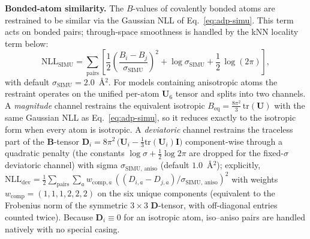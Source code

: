 \documentclass{iucrjournals}
\begin{document}
\textbf{Bonded-atom similarity.} The $B$-values of covalently bonded atoms are
restrained to be similar via the Gaussian NLL of Eq.~\ref{eq:adp-simu}. This
term acts on bonded pairs; through-space smoothness is handled by the kNN
locality term below:
%
\begin{equation}
  \mathrm{NLL}_\mathrm{SIMU} = \sum_\mathrm{pairs}
  \left[\frac{1}{2}\left(\frac{B_{i} - B_{j}}{\sigma_\mathrm{SIMU}}\right)^{2}
  + \log\sigma_\mathrm{SIMU} + \frac{1}{2}\,\log(2\pi)\right],
  \label{eq:adp-simu}
\end{equation}
%
with default $\sigma_\mathrm{SIMU} = 2.0$~\AA$^{2}$.
For models containing anisotropic atoms the restraint operates on the unified
per-atom $\mathbf{U}_{6}$ tensor and splits into two channels. A
\emph{magnitude} channel restrains the equivalent isotropic
$B_\mathrm{eq} = \tfrac{8\pi^{2}}{3}\,\mathrm{tr}(\mathbf{U})$ with the same
Gaussian NLL as Eq.~\ref{eq:adp-simu}, so it reduces exactly to the isotropic
form when every atom is isotropic. A \emph{deviatoric} channel restrains the
traceless part of the $\mathbf{B}$-tensor
$\mathbf{D}_{i} = 8\pi^{2}\,\bigl(\mathbf{U}_{i} - \tfrac{1}{3}\mathrm{tr}(\mathbf{U}_{i})\mathbf{I}\bigr)$
component-wise through a quadratic penalty (the constants
$\log\sigma + \tfrac{1}{2}\log 2\pi$ are dropped for the fixed-$\sigma$
deviatoric channel) with sigma $\sigma_\mathrm{SIMU,\,aniso}$
(default $1.0$~\AA$^{2}$); explicitly,
$\mathrm{NLL}_\mathrm{dev} = \tfrac{1}{2}\sum_\mathrm{pairs}
\sum_{a} w_{\mathrm{comp},a}\,
((D_{i,a} - D_{j,a})/\sigma_\mathrm{SIMU,\,aniso})^{2}$
with weights $w_\mathrm{comp} = (1,1,1,2,2,2)$ on the six unique components
(equivalent to the Frobenius norm of the symmetric $3\times3$
$\mathbf{D}$-tensor, with off-diagonal entries counted twice). Because
$\mathbf{D}_{i} \equiv 0$ for an isotropic atom, iso--aniso pairs are handled
natively with no special casing.
\end{document}
